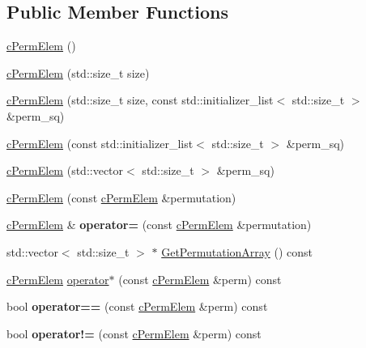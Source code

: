 \subsection*{\-Public \-Member \-Functions}
\begin{DoxyCompactItemize}
\item 
\hyperlink{classcPermElem_a9170fa558dd3cdfae7879631db41235d}{c\-Perm\-Elem} ()
\item 
\hyperlink{classcPermElem_ad3ff2e93580acca710249f0eb7e04bc3}{c\-Perm\-Elem} (std\-::size\-\_\-t size)
\item 
\hyperlink{classcPermElem_a375e3da4877dd48e93ca192bfcd66ddd}{c\-Perm\-Elem} (std\-::size\-\_\-t size, const std\-::initializer\-\_\-list$<$ std\-::size\-\_\-t $>$ \&perm\-\_\-sq)
\item 
\hyperlink{classcPermElem_a88b976442227c8da9ede9cf9d3f865c5}{c\-Perm\-Elem} (const std\-::initializer\-\_\-list$<$ std\-::size\-\_\-t $>$ \&perm\-\_\-sq)
\item 
\hyperlink{classcPermElem_a05895c11888d83bc3d35b3c18d90e8e4}{c\-Perm\-Elem} (std\-::vector$<$ std\-::size\-\_\-t $>$ \&perm\-\_\-sq)
\item 
\hyperlink{classcPermElem_a9cdd0f485986e63a7a848a058aecf402}{c\-Perm\-Elem} (const \hyperlink{classcPermElem}{c\-Perm\-Elem} \&permutation)
\item 
\hypertarget{classcPermElem_a9c05e75d5c9ce57fafc2cee73e396a58}{\hyperlink{classcPermElem}{c\-Perm\-Elem} \& {\bfseries operator=} (const \hyperlink{classcPermElem}{c\-Perm\-Elem} \&permutation)}\label{classcPermElem_a9c05e75d5c9ce57fafc2cee73e396a58}

\item 
std\-::vector$<$ std\-::size\-\_\-t $>$ $\ast$ \hyperlink{classcPermElem_a0d0bfc94a1d7cf92d514293253acf8be}{\-Get\-Permutation\-Array} () const 
\item 
\hyperlink{classcPermElem}{c\-Perm\-Elem} \hyperlink{classcPermElem_a19da6e521f8adf3d252250f3836c563e}{operator$\ast$} (const \hyperlink{classcPermElem}{c\-Perm\-Elem} \&perm) const 
\item 
\hypertarget{classcPermElem_a925aac2e4ac73ec288b7a1e16b941d40}{bool {\bfseries operator==} (const \hyperlink{classcPermElem}{c\-Perm\-Elem} \&perm) const }\label{classcPermElem_a925aac2e4ac73ec288b7a1e16b941d40}

\item 
\hypertarget{classcPermElem_a925cdee12dcc4914417143a88d91c49d}{bool {\bfseries operator!=} (const \hyperlink{classcPermElem}{c\-Perm\-Elem} \&perm) const }\label{classcPermElem_a925cdee12dcc4914417143a88d91c49d}


\end{DoxyCompactItemize}
